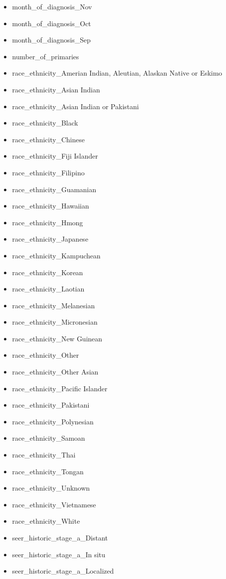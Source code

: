 \documentclass[10pt,letterpaper]{article}
\begin{document}
\begin{itemize}[noitemsep]
\item month\_of\_diagnosis\_Nov
\item month\_of\_diagnosis\_Oct
\item month\_of\_diagnosis\_Sep
\item number\_of\_primaries
\item race\_ethnicity\_Amerian Indian, Aleutian, Alaskan Native or Eskimo
\item race\_ethnicity\_Asian Indian
\item race\_ethnicity\_Asian Indian or Pakistani
\item race\_ethnicity\_Black
\item race\_ethnicity\_Chinese
\item race\_ethnicity\_Fiji Islander
\item race\_ethnicity\_Filipino
\item race\_ethnicity\_Guamanian
\item race\_ethnicity\_Hawaiian
\item race\_ethnicity\_Hmong
\item race\_ethnicity\_Japanese
\item race\_ethnicity\_Kampuchean
\item race\_ethnicity\_Korean
\item race\_ethnicity\_Laotian
\item race\_ethnicity\_Melanesian
\item race\_ethnicity\_Micronesian
\item race\_ethnicity\_New Guinean
\item race\_ethnicity\_Other
\item race\_ethnicity\_Other Asian
\item race\_ethnicity\_Pacific Islander
\item race\_ethnicity\_Pakistani
\item race\_ethnicity\_Polynesian
\item race\_ethnicity\_Samoan
\item race\_ethnicity\_Thai
\item race\_ethnicity\_Tongan
\item race\_ethnicity\_Unknown
\item race\_ethnicity\_Vietnamese
\item race\_ethnicity\_White
\item seer\_historic\_stage\_a\_Distant
\item seer\_historic\_stage\_a\_In situ
\item seer\_historic\_stage\_a\_Localized

\end{itemize}
\end{document}
